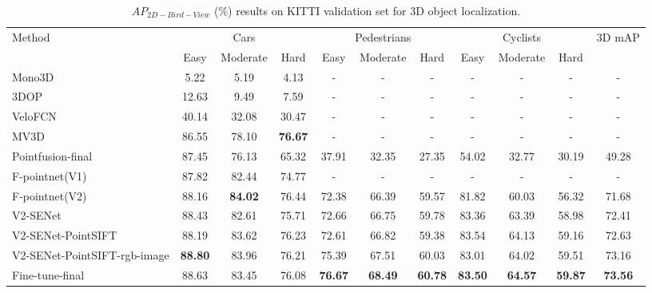 \documentclass[letterpaper]{article}
\begin{document}
\begin{table}[h]
\scriptsize
\centering
\begin{tabular}{l|c|c|c|c|c|c|c|c|c|c}
\hline
\multirow{2}{*}{Method} & \multicolumn{3}{c|}{Cars} &
\multicolumn{3}{c|}{Pedestrians} & \multicolumn{3}{c|}{Cyclists} & \multicolumn{1}{c}{\multirow{2}{*}{3D mAP}} \\
\cline{2-10}

& Easy & Moderate & Hard & Easy & Moderate & Hard & Easy & Moderate & Hard & \multicolumn{1}{c}{} \\
\hline
\hline
Mono3D~\cite{chen2016monocular} &5.22 &5.19 &4.13 &- &- &- &- &- &- &-  \\
3DOP~\cite{chen20153d}   &12.63 &9.49 &7.59 &- &- &- &- &- &- &-  \\
VeloFCN~\cite{li20173d}		            & 40.14 & 32.08 & 30.47 & - & - & - & -  & - & - & - \\
MV3D~\cite{chen2017multi} 	                    & 86.55 & 78.10 & \textbf{76.67} & - & - & - & -  & - & - & - \\
Pointfusion-final~\cite{xu2017pointfusion} 			& 87.45 & 76.13 & 65.32 & 37.91 & 32.35 & 27.35 & 54.02  & 32.77 & 30.19 & 49.28\\
F-pointnet(V1)~\cite{qi2017frustum}			    & 87.82 & 82.44 & 74.77 & - & - & - & -  & - & - & -\\
F-pointnet(V2)~\cite{qi2017frustum} 			    & 88.16 & \textbf{84.02} & 76.44 & 72.38 & 66.39 & 59.57 & 81.82  & 60.03 & 56.32 & 71.68\\
\hline
V2-SENet			        & 88.43 & 82.61 & 75.71 & 72.66 & 66.75 & 59.78 & 83.36  & 63.39 & 58.98 & 72.41\\
V2-SENet-PointSIFT			& 88.19 & 83.62 & 76.23 & 72.61 & 66.82 & 59.38 & 83.54  & 64.13 & 59.16 & 72.63\\
V2-SENet-PointSIFT-rgb-image &\textbf{88.80} &83.96 &76.21 &75.39 &67.51 &60.03 &83.01 &64.02 &59.51 &73.16 \\
Fine-tune-final	& 88.63 & 83.45 & 76.08 & \textbf{76.67} & \textbf{68.49}
                & \textbf{60.78} & \textbf{83.50}  & \textbf{64.57} & \textbf{59.87} & \textbf{73.56}\\
\hline

\end{tabular}
\caption{$AP_{2D-Bird-View}$ (\%) results on KITTI validation set for 3D object localization.}
\label{T2}
\end{table}
\end{document}
